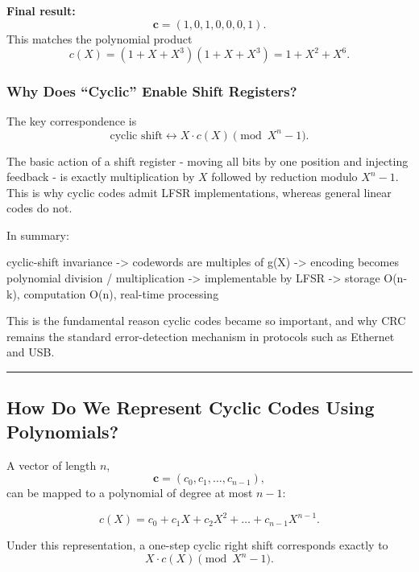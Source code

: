 \documentclass[
]{article}
\newenvironment{Shaded}{}{}
\newcommand{\NormalTok}[1]{#1}
\begin{document}
\textbf{Final result:} \[\mathbf{c}=(1,0,1,0,0,0,1).\] This matches the
polynomial product \[c(X)=(1+X+X^3)(1+X+X^3)=1+X^2+X^6.\]

\subsubsection{Why Does ``Cyclic'' Enable Shift
Registers?}\label{why-does-cyclic-enable-shift-registers}

The key correspondence is
\[\text{cyclic shift} \longleftrightarrow X \cdot c(X) \pmod{X^n-1}.\]

The basic action of a shift register - moving all bits by one position
and injecting feedback - is exactly multiplication by \(X\) followed by
reduction modulo \(X^n-1\). This is why cyclic codes admit LFSR
implementations, whereas general linear codes do not.

In summary:

\begin{Shaded}
\begin{Highlighting}[]
\NormalTok{cyclic{-}shift invariance}
\NormalTok{    {-}\textgreater{} codewords are multiples of g(X)}
\NormalTok{    {-}\textgreater{} encoding becomes polynomial division / multiplication}
\NormalTok{    {-}\textgreater{} implementable by LFSR}
\NormalTok{    {-}\textgreater{} storage O(n{-}k), computation O(n), real{-}time processing}
\end{Highlighting}
\end{Shaded}

This is the fundamental reason cyclic codes became so important, and why
CRC remains the standard error-detection mechanism in protocols such as
Ethernet and USB.

\begin{center}\rule{0.5\linewidth}{0.5pt}\end{center}

\subsection{How Do We Represent Cyclic Codes Using
Polynomials?}\label{how-do-we-represent-cyclic-codes-using-polynomials}

A vector of length \(n\), \[\mathbf{c}=(c_0,c_1,\dots,c_{n-1}),\] can be
mapped to a polynomial of degree at most \(n-1\):

\[c(X)=c_0 + c_1 X + c_2 X^2 + \dots + c_{n-1}X^{n-1}.\]

Under this representation, a one-step cyclic right shift corresponds
exactly to \[X \cdot c(X) \pmod{X^n-1}.\]
\end{document}
